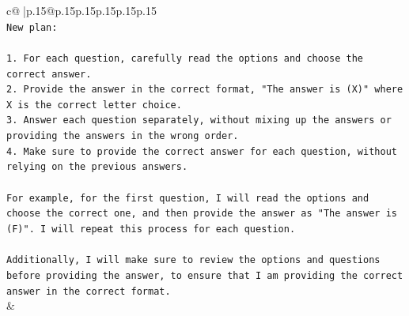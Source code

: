 \documentclass{article}
\begin{document}
{\begin{supertabular}{c@{$\;$}|p{.15\linewidth}@{}p{.15\linewidth}p{.15\linewidth}p{.15\linewidth}p{.15\linewidth}p{.15\linewidth}}
{{{\\ 
\texttt{New plan: } \\
\\ 
\texttt{1. For each question, carefully read the options and choose the correct answer.} \\
\texttt{2. Provide the answer in the correct format, "The answer is (X)" where X is the correct letter choice.} \\
\texttt{3. Answer each question separately, without mixing up the answers or providing the answers in the wrong order.} \\
\texttt{4. Make sure to provide the correct answer for each question, without relying on the previous answers.} \\
\\ 
\texttt{For example, for the first question, I will read the options and choose the correct one, and then provide the answer as "The answer is (F)". I will repeat this process for each question.} \\
\\ 
\texttt{Additionally, I will make sure to review the options and questions before providing the answer, to ensure that I am providing the correct answer in the correct format.} \\
            }
        }
    }
    & \\ \\

\end{supertabular}
}
\end{document}
